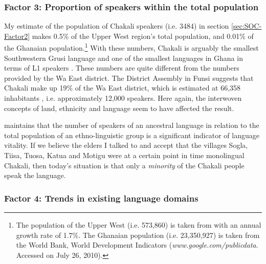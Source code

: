\subsubsection{ Factor 3: Proportion of speakers within the total population}
\label{sec:SOC-Factor3}

My estimate  of the population of Chakali speakers (i.e. 3484) in section
\ref{sec:SOC-Factor2} makes  0.5\% of the Upper West region's total population, 
and  0.01\% of the Ghanaian population.\footnote{The population of the Upper
West (i.e. 573,860) is taken from \cite{GSS00} with an annual growth rate of
1.7\%.  The Ghanaian population (i.e. 23,350,927) is taken from the World Bank,
World Development Indicators ({\it www.google.com/publicdata}. Accessed on July
26, 2010).} With these numbers, Chakali is arguably the smallest Southwestern
Grusi
 language and one of the smallest languages in
Ghana in terms of L1 speakers \citep{Lewi09}. These numbers are quite different from
the  numbers provided by the Wa East district. The District Assembly in
Funsi
suggests that Chakali make up  19\% of the Wa East district, which is estimated
at  66,358 inhabitants \citep{GSS00},  i.e. approximately 12,000 speakers.   Here again, the interwoven  concepts of
land, ethnicity and language seem to have affected the result. 


\citet[9]{Reco03} maintains that the number of speakers of an ancestral language
in relation to the total population of an ethno-linguistic group is a
significant indicator of language vitality. If we believe the elders I talked
to and accept that the villages  Sogla, Tiisa, Tuosa, Katua and Motigu were at 
a certain point in time monolingual Chakali, then  today's  situation is that
only a {\it minority} of the Chakali people speak the language. 

\subsubsection{Factor 4: Trends in existing language domains}
\label{sec:SOC-Factor4}

